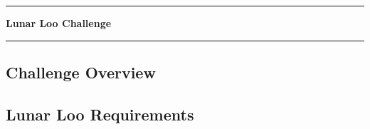 \pagebreak
\chapter[Lunar Loo Challenge]{}\vspace{-2cm}\noindent\rule{\textwidth}{2.5pt}
\thispagestyle{empty}

\vspace{5cm}\textbf{\huge{Lunar Loo Challenge}}

\medskip\noindent\rule{\textwidth}{1pt}

\lipsum[1]

\pagebreak

\section{Challenge Overview}


\section{Lunar Loo Requirements}

